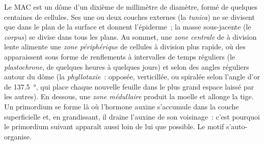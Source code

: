 \begin{proposition}\label{prop:b2:plant-meristems:sam}
Le MAC est un dôme d'un dixième de millimètre de diamètre, formé de
quelques centaines de cellules. Ses une ou deux couches externes (la
\emph{tunica}) ne se divisent que dans le plan de la surface et donnent
l'épiderme~; la masse sous-jacente (le \emph{corpus}) se divise dans
tous les plans. Au sommet, une \emph{zone centrale} de 
à division lente alimente une \emph{zone périphérique} de cellules à
division plus rapide, où des \emph{} apparaissent
sous forme de renflements à intervalles de temps réguliers (le
\emph{plastochrone}, de quelques heures à quelques jours) et selon des
angles réguliers autour du dôme (la \emph{phyllotaxie}~: opposée,
verticillée, ou spiralée selon l'angle d'or de \qty{137.5}{\degree}, qui
place chaque nouvelle feuille dans le plus grand espace laissé par les
autres). En dessous, une \emph{zone médullaire} produit la moelle et
allonge la tige. Un primordium se forme là où l'hormone auxine
s'accumule dans la couche superficielle et, en grandissant, il draine
l'auxine de son voisinage~: c'est pourquoi le primordium suivant apparaît
aussi loin de lui que possible. Le motif s'auto-organise.
\end{proposition}

